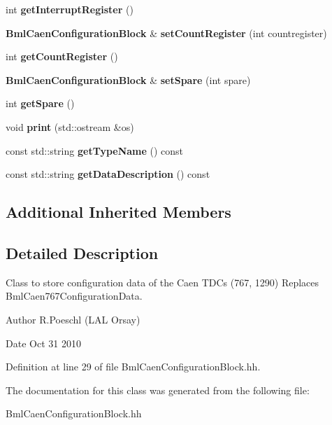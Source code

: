 \begin{DoxyCompactItemize}
\item 
int {\bfseries get\-Interrupt\-Register} ()\label{classCALICE_1_1BmlCaenConfigurationBlock_af4ee7799dca9ad03e3d214b1d736fa13}

\item 
{\bf Bml\-Caen\-Configuration\-Block} \& {\bfseries set\-Count\-Register} (int countregister)\label{classCALICE_1_1BmlCaenConfigurationBlock_a49de9d6d4578e37f78362ca9be910cae}

\item 
int {\bfseries get\-Count\-Register} ()\label{classCALICE_1_1BmlCaenConfigurationBlock_a4b63566dafbbe73c046ea94962f28c4d}

\item 
{\bf Bml\-Caen\-Configuration\-Block} \& {\bfseries set\-Spare} (int spare)\label{classCALICE_1_1BmlCaenConfigurationBlock_a25eafb2a9abb905b2fcea1395d735225}

\item 
int {\bfseries get\-Spare} ()\label{classCALICE_1_1BmlCaenConfigurationBlock_a56e1badfdaed4148f5c89c045a9d8e2f}

\item 
void {\bfseries print} (std\-::ostream \&os)\label{classCALICE_1_1BmlCaenConfigurationBlock_a68dbb32906d68303dad6b5f4a8ba35c2}

\item 
const std\-::string {\bfseries get\-Type\-Name} () const \label{classCALICE_1_1BmlCaenConfigurationBlock_ae6b54fef6a2a397b27237787b4c1ad24}

\item 
const std\-::string {\bfseries get\-Data\-Description} () const \label{classCALICE_1_1BmlCaenConfigurationBlock_a8bd06c4d35fb60d77e1bedb3a53a3523}

\end{DoxyCompactItemize}
\subsection*{Additional Inherited Members}


\subsection{Detailed Description}
Class to store configuration data of the Caen T\-D\-Cs (767, 1290) Replaces Bml\-Caen767\-Configuration\-Data. 

\begin{DoxyAuthor}{Author}
R.\-Poeschl (L\-A\-L Orsay) 
\end{DoxyAuthor}
\begin{DoxyDate}{Date}
Oct 31 2010 
\end{DoxyDate}


Definition at line 29 of file Bml\-Caen\-Configuration\-Block.\-hh.



The documentation for this class was generated from the following file\-:\begin{DoxyCompactItemize}
\item 
Bml\-Caen\-Configuration\-Block.\-hh\end{DoxyCompactItemize}
